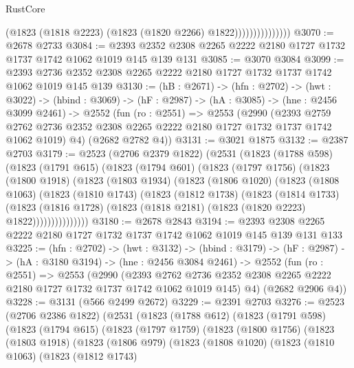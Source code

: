 \begin{lexlean}{RustCore}
\begin{coremodule}
                              (@1823 (@1818 @2223) (@1823 (@1820 @2266) @1822)))))))))))))))
@3070 := @2678 @2733
@3084 := @2393 @2352 @2308 @2265 @2222 @2180 @1727 @1732 @1737 @1742 @1062 @1019 @145 @139 @131
@3085 := @3070 @3084
@3099 := @2393 @2736 @2352 @2308 @2265 @2222 @2180 @1727 @1732 @1737 @1742 @1062 @1019 @145 @139
@3130 := (hB : @2671) ->
  (hfn : @2702) ->
  (hwt : @3022) ->
  (hbind : @3069) ->
  (hF : @2987) ->
  (hA : @3085) ->
  (hne : @2456 @3099 @2461) ->
  @2552
    (fun (ro : @2551) =>
    @2553
      (@2990
        (@2393 @2759 @2762 @2736 @2352 @2308 @2265 @2222 @2180 @1727 @1732 @1737 @1742 @1062 @1019)
        @4)
      (@2682 @2782 @4))
@3131 := @3021 @1875
@3132 := @2387 @2703
@3179 := @2523
    (@2706 @2379 @1822)
    (@2531
      (@1823
        (@1788 @598)
        (@1823
          (@1791 @615)
          (@1823
            (@1794 @601)
            (@1823
              (@1797 @1756)
              (@1823
                (@1800 @1918)
                (@1823
                  (@1803 @1934)
                  (@1823
                    (@1806 @1020)
                    (@1823
                      (@1808 @1063)
                      (@1823
                        (@1810 @1743)
                        (@1823
                          (@1812 @1738)
                          (@1823
                            (@1814 @1733)
                            (@1823
                              (@1816 @1728)
                              (@1823 (@1818 @2181) (@1823 (@1820 @2223) @1822)))))))))))))))
@3180 := @2678 @2843
@3194 := @2393 @2308 @2265 @2222 @2180 @1727 @1732 @1737 @1742 @1062 @1019 @145 @139 @131 @133
@3225 := (hfn : @2702) ->
  (hwt : @3132) ->
  (hbind : @3179) ->
  (hF : @2987) ->
  (hA : @3180 @3194) ->
  (hne : @2456 @3084 @2461) ->
  @2552
    (fun (ro : @2551) =>
    @2553
      (@2990
        (@2393 @2762 @2736 @2352 @2308 @2265 @2222 @2180 @1727 @1732 @1737 @1742 @1062 @1019 @145)
        @4)
      (@2682 @2906 @4))
@3228 := @3131 (@566 @2499 @2672)
@3229 := @2391 @2703
@3276 := @2523
    (@2706 @2386 @1822)
    (@2531
      (@1823
        (@1788 @612)
        (@1823
          (@1791 @598)
          (@1823
            (@1794 @615)
            (@1823
              (@1797 @1759)
              (@1823
                (@1800 @1756)
                (@1823
                  (@1803 @1918)
                  (@1823
                    (@1806 @979)
                    (@1823
                      (@1808 @1020)
                      (@1823
                        (@1810 @1063)
                        (@1823
                          (@1812 @1743)

\end{coremodule}
\end{lexlean}
